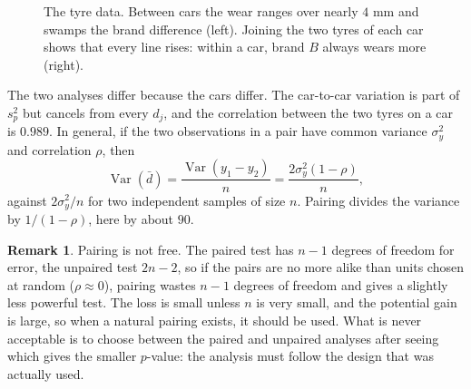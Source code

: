 \documentclass[11pt,a4paper]{article}
\numberwithin{equation}{section}
\DeclareMathOperator{\Var}{Var}
\theoremstyle{definition}
\newtheorem*{remark}{Remark}
\begin{document}
\begin{figure}[H]
\caption{The tyre data. Between cars the wear ranges over nearly $4$ mm and swamps the brand difference (left). Joining the two tyres of each car
shows that every line rises: within a car, brand $B$ always wears more (right).}
\label{fig:pairs}
\end{figure}

The two analyses differ because the cars differ. The car-to-car variation is part of $s_p^2$ but cancels from every $d_j$, and the correlation between the
two tyres on a car is $0.989$. In general, if the two observations in a pair have common variance $\sigma_y^2$ and correlation $\rho$, then
\[
\Var(\bar d) = \frac{\Var(y_1 - y_2)}{n} = \frac{2\sigma_y^2(1 - \rho)}{n} ,
\]
against $2\sigma_y^2/n$ for two independent samples of size $n$. Pairing divides the variance by $1/(1 - \rho)$, here by about $90$.

\begin{remark}
Pairing is not free. The paired test has $n - 1$ degrees of freedom for error, the unpaired test $2n - 2$, so if the pairs are no more alike than units
chosen at random ($\rho \approx 0$), pairing wastes $n - 1$ degrees of freedom and gives a slightly less powerful test. The loss is small unless $n$ is very
small, and the potential gain is large, so when a natural pairing exists, it should be used. What is never acceptable is to choose between the
paired and unpaired analyses after seeing which gives the smaller $p$-value: the analysis must follow the design that was actually used.
\end{remark}
\end{document}
